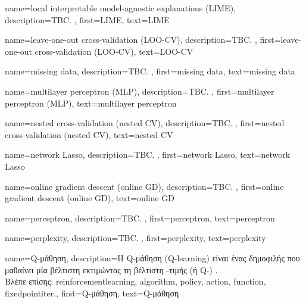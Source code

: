 
{name={local interpretable model-agnostic explanations (LIME)},
	description={TBC. },
	first={LIME},
	text={LIME}
}

{name={leave-one-out cross-validation (LOO-CV)},
	description={TBC. },
	first={leave-one-out cross-validation (LOO-CV)},
	text={LOO-CV}
}

{name={missing data},
	description={TBC. },
	first={missing data},
	text={missing data}  
}

{name={multilayer perceptron (MLP)},
	description={TBC. },
	first={multilayer perceptron (MLP)},
	text={multilayer perceptron}
}

{name={nested cross-validation (nested CV)},
	description={TBC. },
	first={nested cross-validation (nested CV)},
	text={nested CV}
}

{name={network Lasso},
	description={TBC. },
	first={network Lasso},
	text={network Lasso}
}

{name={online gradient descent (online GD)}, 
	description={TBC. },
	first={online gradient descent (online GD)},
	text={online GD} 
}

{name={perceptron}, 
	description={TBC. },
	first={perceptron},
	text={perceptron}
}

{name={perplexity},
	description={TBC. },
 	first={perplexity},
 	text={perplexity}
}

{name={Q-\foreignlanguage{greek}{μάθηση}}, 
	description={\foreignlanguage{greek}{Η} Q-\foreignlanguage{greek}{μάθηση} (Q-learning) 
		\foreignlanguage{greek}{είναι ένας δημοφιλής}   
		\foreignlanguage{greek}{που μαθαίνει μία βέλτιστη}  \foreignlanguage{greek}{εκτιμώντας τη βέλτιστη} 
		 -\foreignlanguage{greek}{τιμής (ή} Q-) \cite{SuttonEd2}.  
		\\
		\foreignlanguage{greek}{Βλέπε επίσης:} \gls{reinforcementlearning}, \gls{algorithm}, \gls{policy}, \gls{action}, \gls{function}, \gls{fixedpointiter}.},
	first={Q-\foreignlanguage{greek}{μάθηση}},
	text={Q-\foreignlanguage{greek}{μάθηση}} 
}

